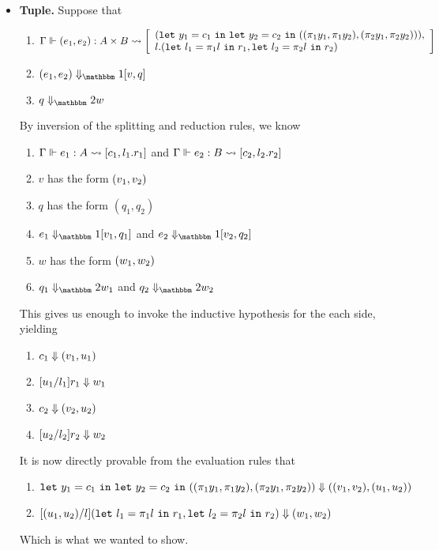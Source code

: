 \documentclass{article}
\begin{document}
\begin{itemize}
\item {\bf Tuple.} Suppose that
\begin{enumerate}
\item ${\Gamma} \Vdash {(e_1,e_2)}:{A\times B} \rightsquigarrow \left[{ \begin{array}{l}
		({\tt let}~{y_1} = {c_1}~{\tt in}~{{\tt let}~{y_2} = {c_2}~{\tt in}~{((\pi_1 y_1, \pi_1 y_2),(\pi_2 y_1, \pi_2 y_2))}}), \\
		l.({\tt let}~{l_1} = {\pi_1 l}~{\tt in}~{r_1},{\tt let}~{l_2} = {\pi_2 l}~{\tt in}~{r_2})
		\end{array}}\right] $
\item $\rsone{(e_1,e_2)}{v}{q}$
\item $\reducetwo{q}{w}$
\end{enumerate}
By inversion of the splitting and reduction rules, we know
\begin{enumerate}
\item ${\Gamma} \Vdash {e_1}:{A} \rightsquigarrow \left[{c_1,l_1.r_1}\right]$ and ${\Gamma} \Vdash {e_2}:{B} \rightsquigarrow \left[{c_2,l_2.r_2}\right]$
\item $v$ has the form $({v_1},{v_2})$
\item $q$ has the form $(q_1,q_2)$
\item $\rsone{e_1}{v_1}{q_1}$ and $\rsone{e_2}{v_2}{q_2}$
\item $w$ has the form $({w_1},{w_2})$
\item $\reducetwo{q_1}{w_1}$ and $\reducetwo{q_2}{w_2}$
\end{enumerate}
This gives us enough to invoke the inductive hypothesis for the each side, yielding
\begin{enumerate}
\item ${c_1} \Downarrow {({v_1},{u_1})}$ 
\item ${[u_1/l_1]r_1} \Downarrow {w_1}$ 
\item ${c_2} \Downarrow {({v_2},{u_2})}$ 
\item ${[u_2/l_2]r_2} \Downarrow {w_2}$ 
\end{enumerate}
It is now directly provable from the evaluation rules that
\begin{enumerate}
\item ${{\tt let}~{y_1} = {c_1}~{\tt in}~{{\tt let}~{y_2} = {c_2}~{\tt in}~{((\pi_1 y_1, \pi_1 y_2),(\pi_2 y_1, \pi_2 y_2))}}} \Downarrow {({({v_1},{v_2})},{({u_1},{u_2})})}$
\item ${[({u_1},{u_2})/l]({\tt let}~{l_1} = {\pi_1 l}~{\tt in}~{r_1},{\tt let}~{l_2} = {\pi_2 l}~{\tt in}~{r_2})} \Downarrow {({w_1},{w_2})}$
\end{enumerate}
Which is what we wanted to show.


\end{itemize}
\end{document}
